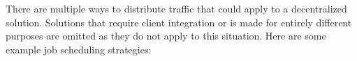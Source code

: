 There are multiple ways to distribute traffic that could apply to a decentralized solution.
Solutions that require client integration or is made for entirely different purposes are omitted as they do not apply to this situation.
Here are some example job scheduling strategies:

